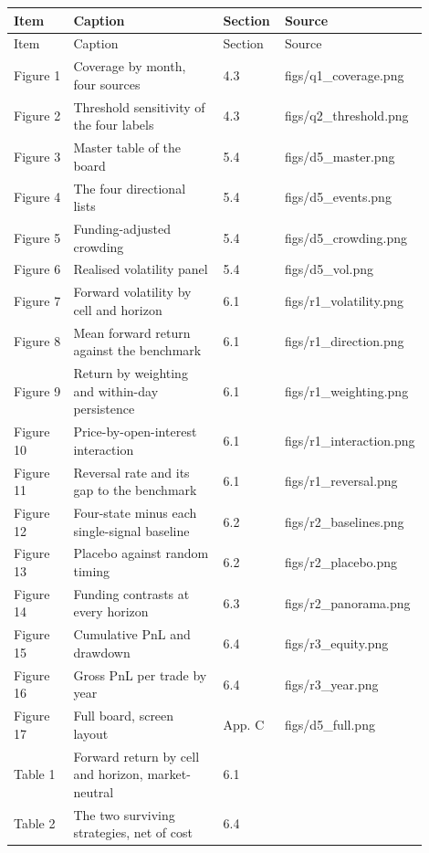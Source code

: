 \documentclass[11pt,a4paper]{article}
\begin{document}
{{\footnotesize\setlength{\tabcolsep}{4pt}
\begin{longtable}{p{0.15\linewidth}p{0.40\linewidth}p{0.15\linewidth}p{0.20\linewidth}}
\toprule
Item & Caption & Section & Source \\
\midrule
\endfirsthead
\toprule
Item & Caption & Section & Source \\
\midrule
\endhead
\bottomrule
\endfoot
Figure 1 & Coverage by month, four sources & 4.3 & figs/q1\_coverage.png \\
Figure 2 & Threshold sensitivity of the four labels & 4.3 & figs/q2\_threshold.png \\
Figure 3 & Master table of the board & 5.4 & figs/d5\_master.png \\
Figure 4 & The four directional lists & 5.4 & figs/d5\_events.png \\
Figure 5 & Funding-adjusted crowding & 5.4 & figs/d5\_crowding.png \\
Figure 6 & Realised volatility panel & 5.4 & figs/d5\_vol.png \\
Figure 7 & Forward volatility by cell and horizon & 6.1 & figs/r1\_volatility.png \\
Figure 8 & Mean forward return against the benchmark & 6.1 & figs/r1\_direction.png \\
Figure 9 & Return by weighting and within-day persistence & 6.1 & figs/r1\_weighting.png \\
Figure 10 & Price-by-open-interest interaction & 6.1 & figs/r1\_interaction.png \\
Figure 11 & Reversal rate and its gap to the benchmark & 6.1 & figs/r1\_reversal.png \\
Figure 12 & Four-state minus each single-signal baseline & 6.2 & figs/r2\_baselines.png \\
Figure 13 & Placebo against random timing & 6.2 & figs/r2\_placebo.png \\
Figure 14 & Funding contrasts at every horizon & 6.3 & figs/r2\_panorama.png \\
Figure 15 & Cumulative PnL and drawdown & 6.4 & figs/r3\_equity.png \\
Figure 16 & Gross PnL per trade by year & 6.4 & figs/r3\_year.png \\
Figure 17 & Full board, screen layout & App. C & figs/d5\_full.png \\
Table 1 & Forward return by cell and horizon, market-neutral & 6.1 &  \\
Table 2 & The two surviving strategies, net of cost & 6.4 &  \\
\end{longtable}
}

}
\end{document}
